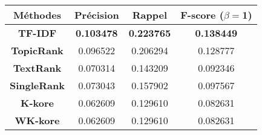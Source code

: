 \begin{tabular}{|c|c|c|c|}
\hline 
\textbf{Méthodes} & \textbf{Précision} & \textbf{Rappel} & \textbf{F-score ($\beta=$1)} \\ 
\hline 
\textbf{TF-IDF} & \textbf{0.103478} & \textbf{0.223765} & \textbf{0.138449} \\ 
\hline 
\textbf{TopicRank} & 0.096522 & 0.206294 & 0.128777 \\ 
\hline 
\textbf{TextRank} & 0.070314 & 0.143209 & 0.092346 \\ 
\hline 
\textbf{SingleRank} & 0.073043 & 0.157902 & 0.097567 \\ 
\hline 
\textbf{K-kore} & 0.062609 & 0.129610 & 0.082631 \\ 
\hline 
\textbf{WK-kore} & 0.062609 & 0.129610 & 0.082631 \\ 
\hline 
\end{tabular}